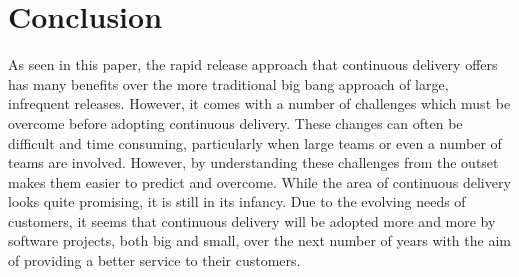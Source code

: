 \documentclass[10pt,journal,compsoc]{IEEEtran}
\begin{document}

\section{Conclusion}
As seen in this paper, the rapid release approach that continuous delivery offers has many benefits over the more traditional big bang approach of large, infrequent releases. However, it comes with a number of challenges which must be overcome before adopting continuous delivery. These changes can often be difficult and time consuming, particularly when large teams or even a number of teams are involved. However, by understanding these challenges from the outset makes them easier to predict and overcome. While the area of continuous delivery looks quite promising, it is still in its infancy. Due to the evolving needs of customers, it seems that continuous delivery will be adopted more and more by software projects, both big and small, over the next number of years with the aim of providing a better service to their customers.


%
\end{document}
